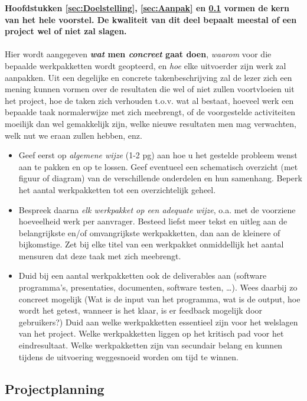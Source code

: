 \documentclass[10pt]{article}
\begin{document}
\textbf{Hoofdstukken \ref{sec:Doelstelling}, \ref{sec:Aanpak} en \ref{sec:Projectplanning} vormen de kern van het hele voorstel. De kwaliteit van dit deel bepaalt meestal of een project wel of niet zal slagen. }\\
\\
Hier wordt aangegeven \textbf{\emph{wat} men \emph{concreet} gaat doen}, \emph{waarom} voor die bepaalde werkpakketten wordt geopteerd, en \emph{hoe} elke uitvoerder zijn werk zal aanpakken. Uit een degelijke en concrete takenbeschrijving zal de lezer zich een mening kunnen vormen over de resultaten die wel of niet zullen voortvloeien uit het project, hoe de taken zich verhouden t.o.v. wat al bestaat, hoeveel werk een bepaalde taak normalerwijze met zich meebrengt, of de voorgestelde activiteiten moeilijk dan wel gemakkelijk zijn, welke nieuwe resultaten men mag verwachten, welk nut we eraan zullen hebben, enz.

\begin{itemize}
\item	Geef eerst op \emph{algemene wijze} (1-2 pg) aan hoe u het gestelde probleem wenst aan te pakken en op te lossen. Geef eventueel een schematisch overzicht (met figuur of diagram) van de verschillende onderdelen en hun samenhang. Beperk het aantal werkpakketten tot een overzichtelijk geheel. 

\item	Bespreek daarna \emph{elk werkpakket op een adequate wijze}, o.a. met de voorziene hoeveelheid werk per aanvrager. Besteed liefst meer tekst en uitleg aan de belangrijkste en/of omvangrijkste werkpakketten, dan aan de kleinere of bijkomstige. Zet bij elke titel van een werkpakket onmiddellijk het aantal mensuren dat deze taak met zich meebrengt. 

\item	Duid bij een aantal werkpakketten ook de deliverables aan (software programma's, presentaties, documenten, software testen, \ldots). Wees daarbij zo concreet mogelijk (Wat is de input van het programma, wat is de output, hoe wordt het getest, wanneer is het klaar, is er feedback mogelijk door gebruikers?) Duid aan welke werkpakketten essentieel zijn voor het welslagen van het project. Welke werkpakketten liggen op het kritisch pad voor het eindresultaat. Welke werkpakketten zijn van secundair belang en kunnen tijdens de uitvoering weggesnoeid worden om tijd te winnen.

\end{itemize}

\subsection{Projectplanning}\label{sec:Projectplanning}
\end{document}
